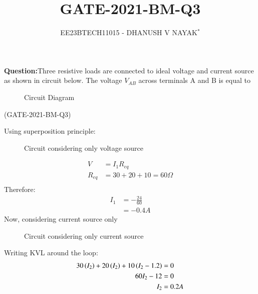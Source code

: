 \documentclass[journal,12pt,twocolumn]{IEEEtran}
\theoremstyle{remark}
\begin{document}

\title{GATE-2021-BM-Q3}
\author{EE23BTECH11015 - DHANUSH V NAYAK$^{*}$%
}
\maketitle
\newpage
\bigskip
\renewcommand{\thefigure}{\arabic{figure}}
\renewcommand{\thetable}{\theenumi}
\textbf{Question:}Three resistive loads are connected to ideal voltage and current source as shown in circuit below. The voltage $V_{AB}$ across terminals A and B is equal to 
\begin{figure}[H] 
    \centering
    
    \caption{Circuit Diagram}
    \label{fig:gate_21_bm_q3_ckt}
\end{figure}
\hfill(GATE-2021-BM-Q3)\\
\solution 

Using superposition principle:
\begin{figure}[H] 
    \centering
    \caption{Circuit considering only voltage source}
    \label{fig:gate_21_bm_q3_ckt_1}
\end{figure}
\begin{align}
    V &= I_{1}R_{eq}\\
    R_{eq} &= 30 + 20 + 10 = 60 \Omega\\
\end{align}
Therefore:
\begin{align}
    I_{1} &= -\frac{24}{60} \\
         &= -0.4 A\label{eq:gate21_Bm_q3_I1_result}
\end{align}
Now, considering current source only 
\begin{figure}[H] 
    \centering
    \caption{Circuit considering only current source}
    \label{fig:gate_21_bm_q3_ckt_2}
\end{figure}
Writing KVL around the loop:
\begin{align}
    30\left(I_2\right) + 20\left(I_2\right) + 10\left(I_2-1.2\right) &=0\\
    60I_2 -12 &=0\\
    I_2&= 0.2 A \label{eq:gate21_bm_q3_I2_res}
\end{align}
     
\end{document}
